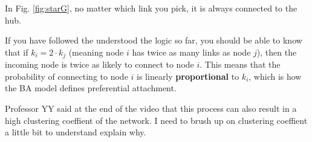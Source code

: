 \documentclass[
]{krantz}
\makeatletter
\newenvironment{kframe}{%
\medskip{}
\setlength{\fboxsep}{.8em}
 \def\at@end@of@kframe{}%
 \ifinner\ifhmode%
  \def\at@end@of@kframe{\end{minipage}}%
  \begin{minipage}{\columnwidth}%
 \fi\fi%
 \def\FrameCommand##1{\hskip\@totalleftmargin \hskip-\fboxsep
 \colorbox{shadecolor}{##1}\hskip-\fboxsep
     \hskip-\linewidth \hskip-\@totalleftmargin \hskip\columnwidth}%
 \MakeFramed {\advance\hsize-\width
   \@totalleftmargin\z@ \linewidth\hsize
   \@setminipage}}%
 {\par\unskip\endMakeFramed%
 \at@end@of@kframe}
\newenvironment{rmdblock}[1]
  {
  \begin{itemize}
  \renewcommand{\labelitemi}{
    \raisebox{-.7\height}[0pt][0pt]{
      {\setkeys{Gin}{width=3em,keepaspectratio}\texttt{[image: images/\#1]}}
    }
  }
  \setlength{\fboxsep}{1em}
  \begin{kframe}
  \item
  }
  {
  \end{kframe}
  \end{itemize}
  }
\newenvironment{rmdreminder}
  {\begin{rmdblock}{reminder}}
  {\end{rmdblock}}
\makeatother
\begin{document}
In Fig. \ref{fig:starG}, no matter which link you pick, it is always connected to the hub.

If you have followed the understood the logic so far, you should be able to know that if \(k_i = 2 \cdot k_j\) (meaning node \(i\) has twice as many links as node \(j\)), then the incoming node is twice as likely to connect to node \(i\). This means that the probability of connecting to node \(i\) is linearly \textbf{proportional} to \(k_i\), which is how the BA model defines preferential attachment.

\begin{rmdreminder}
Professor YY said at the end of the video that this process can also result in a high clustering coeffient of the network. I need to brush up on clustering coeffient a little bit to understand explain why.
\end{rmdreminder}

  

\backmatter
\printindex
\end{document}
